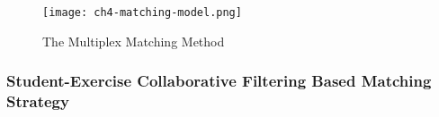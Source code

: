 \begin{figure}[h]
  \centering
  \texttt{[image: ch4-matching-model.png]}
  \caption{The Multiplex Matching Method}\label{fig:ch4-matching-1}
\end{figure}

\subsubsection{Student-Exercise Collaborative Filtering Based Matching Strategy}





